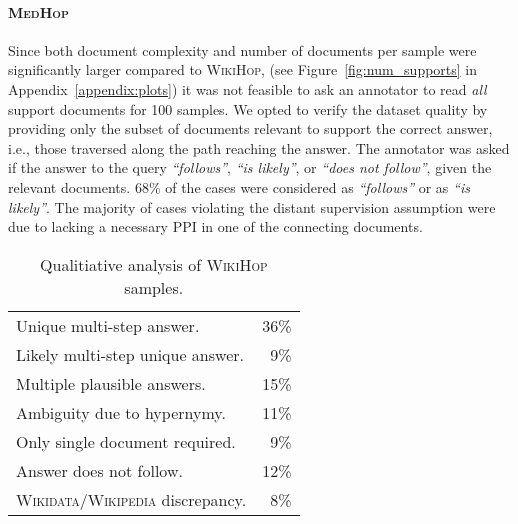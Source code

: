 \documentclass[11pt,letterpaper]{article}
\newcommand{\MedHop}{\textsc{MedHop}\xspace}
\newcommand{\WikiHop}{\textsc{WikiHop}\xspace}
\newcommand{\Wikidata}{\textsc{Wikidata}\xspace}
\newcommand{\Wikipedia}{\textsc{Wikipedia}\xspace}
\begin{document}
\paragraph{\MedHop}
Since both document complexity and number of documents per sample were significantly larger compared to \WikiHop, (see Figure~\ref{fig:num_supports} in Appendix~\ref{appendix:plots}) it was not feasible to ask an annotator to read \emph{all} support documents for 100 samples.
We opted to verify the dataset quality by providing only the subset of documents relevant to support the correct answer, i.e., those traversed along the path reaching the answer.
The annotator was asked if the answer to the query \textit{``follows''}, \textit{``is likely''}, or \textit{``does not follow''}, given the relevant documents.
68\% of the cases were considered as \textit{``follows''} or as \textit{``is likely''}.
The majority of cases violating the distant supervision assumption were due to lacking a necessary PPI in one of the connecting documents.



\begin{table}[t]
    \centering
    \begin{tabular}{lr}
        Unique multi-step answer.  & 36\%                          \\
        Likely multi-step unique answer.                         &  9\%                          \\
        Multiple plausible answers.          & 15\%                          \\
        Ambiguity due to hypernymy.                              & 11\%                          \\
        Only single document required.           &  9\%                          \\
        \midrule
        Answer does not follow.                              & 12\%                          \\
        \Wikidata/\Wikipedia discrepancy.     &  8\%                          \\
    \end{tabular}
    \caption{
       Qualitiative analysis of \WikiHop samples.
}
    \label{tbl:wikihop_qualitative}
\end{table}
\end{document}
